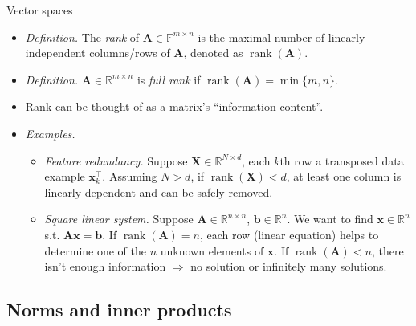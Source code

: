 \documentclass{beamer}
\numberwithin{equation}{section}
\begin{document}
\begin{frame}{Vector spaces}
    \begin{itemize}
        \item
        \textit{Definition.} The \textit{rank} of $ \mathbf{A} \in
        \mathbb{F}^{m \times n} $ is the maximal number of linearly
        independent columns/rows of $ \mathbf{A} $, denoted as
        $ \operatorname{rank}(\mathbf{A}) $.

        \item
        \textit{Definition.} $ \mathbf{A} \in \mathbb{R}^{m \times n} $ is
        \textit{full rank} if
        $ \operatorname{rank}(\mathbf{A}) = \min\{m, n\} $.

        \item
        Rank can be thought of as a matrix's ``information content''.

        \item
        \textit{Examples.}
        \begin{itemize}
            \item
            \textit{Feature redundancy.} Suppose $ \mathbf{X} \in
            \mathbb{R}^{N \times d} $, each $ k $th row a transposed data
            example $ \mathbf{x}_k^\top $. Assuming $ N > d $, if
            $ \operatorname{rank}(\mathbf{X}) < d $, at least one column is
            linearly dependent and can be safely removed.

            \item
            \textit{Square linear system.} Suppose $ \mathbf{A} \in
            \mathbb{R}^{n \times n} $, $ \mathbf{b} \in \mathbb{R}^n $. We
            want to find $ \mathbf{x} \in \mathbb{R}^n $ s.t. $ \mathbf{Ax} =
            \mathbf{b} $. If $ \operatorname{rank}(\mathbf{A}) = n $, each row
            (linear equation) helps to determine one of the $ n $ unknown
            elements of $ \mathbf{x} $. If
            $ \operatorname{rank}(\mathbf{A}) < n $, there isn't enough
            information $ \Rightarrow  $ no solution or infinitely many
            solutions.
        \end{itemize}
    \end{itemize}
\end{frame}

\subsection{Norms and inner products}
\end{document}
